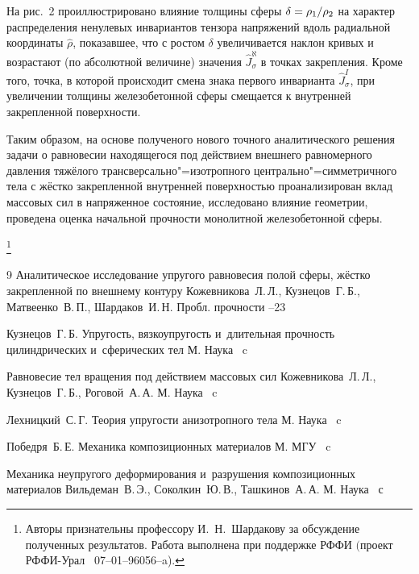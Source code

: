 На рис.~2 проиллюстрировано влияние толщины сферы $\delta = {\rho _1
} \mathord{\left/ {\vphantom {{\rho _1 } {\rho _2 }}} \right.
\kern-\nulldelimiterspace} {\rho _2 }$ на характер распределения
ненулевых инвариантов тензора напряжений вдоль радиальной координаты
$\hat {\rho }$, показавшее, что с ростом $\delta $ увеличивается
наклон кривых и возрастают (по абсолютной величине) значения $\hat
{J}_\sigma ^{\aleph} $ в точках закрепления. Кроме того, точка, в
которой происходит смена знака первого инварианта $\hat {J}_\sigma
^I $, при увеличении толщины железобетонной сферы смещается к
внутренней закрепленной поверхности.

\smallskip

 Таким образом, на основе полученого нового
точного аналитического решения задачи о равновесии находящегося под
действием внешнего равномерного давления тяжёлого
трансверсально"=изотропного центрально"=симметричного тела с жёстко
закрепленной внутренней поверхностью проанализирован вклад массовых
сил в напряженное состояние, исследовано влияние геометрии,
проведена оценка начальной прочности монолитной железобетонной
сферы.

\thanks{Авторы признательны профессору И.~Н.~Шардакову за обсуждение
полученных резуль\-татов. Работа выполнена при  поддержке
РФФИ $($проект РФФИ-Урал \rm \mbox{\No~07--01--96056--a).}}

\vspace{-3mm}

\begin{thebibliography}{9}
\paper
Аналитическое исследование упругого равновесия полой сферы, жёстко
закрепленной по внешнему контуру 
\by Кожевникова~Л.\,Л., Кузнецов~Г.\,Б., Матвеенко~В.\,П., Шардаков~И.\,Н.
\jour Пробл. прочности
--23

\by Кузнецов~Г.\,Б.
\book Упругость, вязкоупругость и~длительная прочность цилиндрических и~сферических тел 
\publaddr М.
\publ Наука
~c

\book Равновесие тел вращения под действием массовых сил 
\by Кожевникова~Л.\,Л., Кузнецов~Г.\,Б., Роговой~А.\,А.
\publaddr М.
\publ Наука
~c

\by Лехницкий~С.\,Г.
\book  Теория упругости анизотропного тела
\publaddr М.
\publ Наука
~c

\by Победря~Б.\,Е.
\book Механика композиционных материалов 
\publaddr М.
\publ МГУ
~c

\book Механика неупругого деформирования и~разрушения композиционных материалов 
\by Вильдеман~В.\,Э., Соколкин~Ю.\,В., Ташкинов~А.\,А.
\publaddr М.
\publ Наука
~с


\end{thebibliography}

\vspace{-10mm}

\makeengtitle

%

%
%
